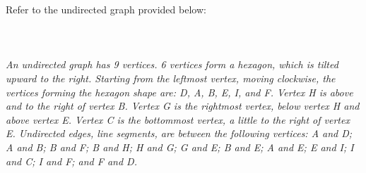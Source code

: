 Refer to the undirected graph provided below:
\\\\
  \\\\
{\color{blue}{\bf Figure 6:} \emph{An undirected graph has 9 vertices. 6 vertices form a hexagon, which is tilted upward to the right. Starting from the leftmost vertex, moving clockwise, the vertices forming the hexagon shape are: D, A, B, E, I, and F. Vertex H is above and to the right of vertex B. Vertex G is the rightmost vertex, below vertex H and above vertex E. Vertex C is the bottommost vertex, a little to the right of vertex E. Undirected edges, line segments, are between the following vertices: A and D; A and B; B and F; B and H; H and G; G and E; B and E; A and E; E and I; I and C; I and F; and F and D.
}
}
\\
\\

